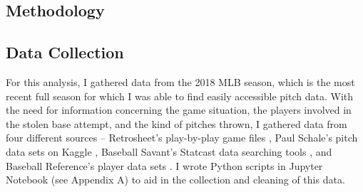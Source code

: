 \documentclass{article}
\begin{document}
\newpage
\begin{center}
    \section{Methodology}
\end{center}

\subsection{Data Collection}
For this analysis, I gathered data from the 2018 MLB season, which is the most recent full season for which I was able to find easily accessible pitch data. With the need for information concerning the game situation, the players involved in the stolen base attempt, and the kind of pitches thrown, I gathered data from four different sources – Retrosheet’s play-by-play game files \citep{Retrosheet}, Paul Schale’s pitch data sets on Kaggle \citep{schale}, Baseball Savant’s Statcast data searching tools \citep{Statcast}, and Baseball Reference’s player data sets \citep{Baseball-Reference}. I wrote Python scripts in Jupyter Notebook (see Appendix A) to aid in the collection and cleaning of this data.
\end{document}
